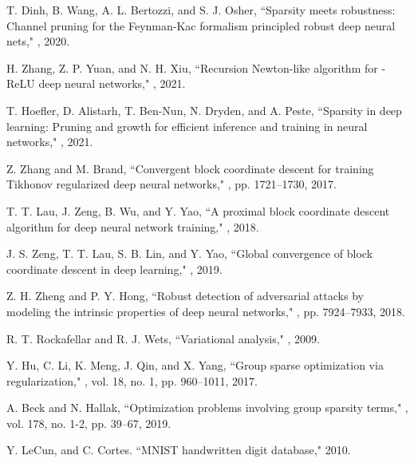 \documentclass[journal]{IEEEtran}
\begin{document}
\begin{thebibliography}{99}
T. Dinh, B. Wang, A. L. Bertozzi, and S. J. Osher,
\newblock  ``Sparsity meets robustness: Channel pruning for the Feynman-Kac formalism principled robust deep neural nets,"
, 2020.


H. Zhang, Z. P. Yuan, and N. H. Xiu,
\newblock  ``Recursion Newton-like algorithm for -ReLU deep neural networks,"
, 2021.



T. Hoefler, D. Alistarh, T. Ben-Nun, N. Dryden, and A. Peste,
\newblock  ``Sparsity in deep learning: Pruning and growth for efficient inference and training in neural networks,"
, 2021.


Z. Zhang and M. Brand,
\newblock  ``Convergent block coordinate descent for training Tikhonov regularized  deep neural networks,"
, pp. 1721--1730, 2017.


T. T. Lau, J. Zeng, B. Wu, and Y. Yao,
\newblock  ``A proximal block coordinate descent algorithm for deep neural network  training,"
, 2018.


J. S. Zeng, T. T. Lau, S. B. Lin, and Y. Yao,
\newblock  ``Global convergence of block coordinate descent in deep learning,"
, 2019.


Z. H. Zheng and P. Y. Hong,
\newblock  ``Robust detection of adversarial attacks by modeling the intrinsic properties of deep neural networks,"
, pp. 7924--7933, 2018.


R. T. Rockafellar and R. J. Wets,
\newblock  ``Variational analysis,"
, 2009.


Y. Hu, C. Li, K. Meng, J. Qin, and X. Yang,
\newblock  ``Group sparse optimization via  regularization,"
,
\newblock vol. 18, no. 1, pp. 960--1011, 2017.


A. Beck and N. Hallak,
\newblock  ``Optimization problems involving group sparsity terms,"
,
\newblock vol. 178, no. 1-2, pp. 39--67, 2019.







Y. LeCun, and C. Cortes.
\newblock  ``MNIST handwritten digit database," 2010.



\end{thebibliography}
\end{document}
